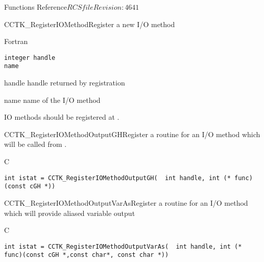 \begin{cactuspart}{ Functions Reference}{$RCSfile$}{$Revision: 4641 $}
\begin{FunctionDescription}{CCTK\_RegisterIOMethod}{Register a new I/O method}
\begin{SynopsisSection}
\begin{Synopsis}{Fortran}
\begin{verbatim}
integer handle
name\end{verbatim}
\end{Synopsis}
\end{SynopsisSection}
\begin{ParameterSection}
\begin{Parameter}{handle}
handle returned by registration
\end{Parameter}
\begin{Parameter}{name}
name of the I/O method
\end{Parameter}
\end{ParameterSection}
\begin{Discussion}
IO methods should be registered at .
\end{Discussion}
\end{FunctionDescription}


\begin{FunctionDescription}{CCTK\_RegisterIOMethodOutputGH}{Register a routine for an I/O method which will be called from .}
\label{CCTK-RegisterIOMethodOutputGH}
\begin{SynopsisSection}
\begin{Synopsis}{C}
\begin{verbatim}int istat = CCTK_RegisterIOMethodOutputGH(  int handle, int (* func)(const cGH *))\end{verbatim}
\end{Synopsis}
\end{SynopsisSection}
\end{FunctionDescription}


\begin{FunctionDescription}{CCTK\_RegisterIOMethodOutputVarAs}{Register a routine for an I/O method which will provide aliased variable output}
\label{CCTK-RegisterIOMethodOutputVarAs}
\begin{SynopsisSection}
\begin{Synopsis}{C}
\begin{verbatim}int istat = CCTK_RegisterIOMethodOutputVarAs(  int handle, int (* func)(const cGH *,const char*, const char *))\end{verbatim}
\end{Synopsis}
\end{SynopsisSection}
\end{FunctionDescription}



\end{cactuspart}
